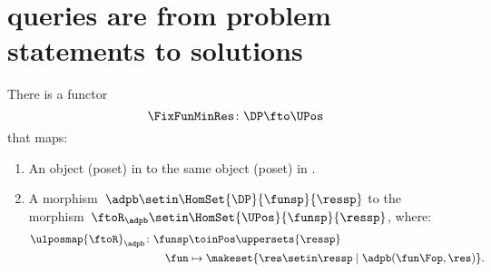 \section[Queries as \SY{functors}]{\DP queries are from problem statements to solutions}

\begin{lemma}
    \label{lem:covfunctor}
    There is a functor
    \begin{equation}
        \FixFunMinRes\colon \DP \fto \UPos
    \end{equation}
    that maps:
    \begin{enumerate}
        \item An object (poset) in \DP to the same object (poset) in \UPos.
        \item A morphism~$\adpb\setin \HomSet{\DP}{\funsp}{\ressp}$ to the morphism~$\ftoR_{\adpb}\setin \HomSet{\UPos}{\funsp}{\ressp}$, where:
              \begin{equation}
                  \begin{aligned}
                      \ulposmap{\ftoR}_{\adpb}\colon \funsp & \toinPos \uppersets{\ressp} \\
                      \fun                                  & \mapsto \makeset{\res \setin \ressp\mid \adpb(\fun\Fop,\res)}.
                  \end{aligned}
              \end{equation}
    \end{enumerate}
\end{lemma}

